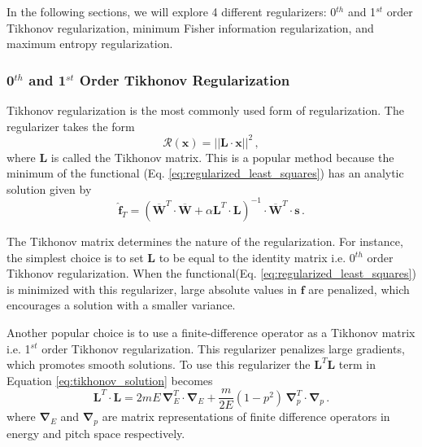 In the following sections, we will explore 4 different regularizers: 0$^{th}$ and 1$^{st}$ order Tikhonov regularization, minimum Fisher information regularization, and maximum entropy regularization.

\subsubsection{0$^{th}$ and 1$^{st}$ Order Tikhonov Regularization}
Tikhonov regularization is the most commonly used form of regularization. The regularizer takes the form
\begin{equation}
    \mathcal{R}(\mathbf{x}) = ||\mathbf{L}\cdot\mathbf{x}||^2 \,,
\end{equation}
where $\mathbf{L}$ is called the Tikhonov matrix. This is a popular method because the minimum of the functional (Eq. \ref{eq:regularized_least_squares}) has an analytic solution given by
\begin{equation}\label{eq:tikhonov_solution}
    \mathbf{\hat{f}}_T = \left(\mathbf{\overline{W}}^T \cdot \mathbf{\overline{W}} + \alpha \mathbf{L}^T\cdot \mathbf{L} \right)^{-1} \cdot \mathbf{\overline{W}}^T \cdot \mathbf{s} \, . 
\end{equation}

The Tikhonov matrix determines the nature of the regularization. 
For instance, the simplest choice is to set $\mathbf{L}$ to be equal to the identity matrix i.e. 0$^{th}$ order Tikhonov regularization. When the functional(Eq. \ref{eq:regularized_least_squares}) is minimized with this regularizer, large absolute values in $\mathbf{f}$ are penalized, which encourages a solution with a smaller variance.

Another popular choice is to use a finite-difference operator as a Tikhonov matrix i.e. 1$^{st}$ order Tikhonov regularization. This regularizer penalizes large gradients, which promotes smooth solutions.
To use this regularizer the $\mathbf{L}^T \mathbf{L}$ term in Equation \ref{eq:tikhonov_solution} becomes
\begin{equation}
    \mathbf{L}^T \cdot \mathbf{L} = 2mE \, \boldsymbol{\nabla}_E^T \cdot \boldsymbol{\nabla}_E + \frac{m}{2E}\left(1-p^2 \right) \, \boldsymbol{\nabla}_p^T \cdot \boldsymbol{\nabla}_p \, .
\end{equation}
where $\boldsymbol{\nabla}_{E}$ and $\boldsymbol{\nabla}_{p}$ are matrix representations of finite difference operators in energy and pitch space respectively\cite{jacobsen_stagner2016}.

